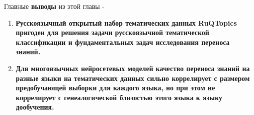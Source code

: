 Главные \textbf{выводы} из этой главы -
\begin{enumerate}
\item \textbf{Русскоязычный открытый набор тематических данных {RuQTopics} пригоден для решения задачи русскоязычной тематической классификации и фундаментальных задач исследования переноса знаний.}
\item \textbf{Для многоязычных нейросетевых моделей качество переноса знаний на разные языки на тематических данных сильно коррелирует с размером предобучающей выборки для каждого языка, но при этом не коррелирует с генеалогической близостью этого языка к языку дообучения.}
\end{enumerate}


 
